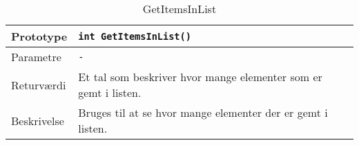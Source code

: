 \begin{table}[h]
\begin{tabularx}{\textwidth}{| >{\raggedright\arraybackslash}p{2.5 cm} | >{\raggedright\arraybackslash}X |} \hline
Prototype & \texttt{int GetItemsInList()} \\\hline
Parametre & \texttt{-} \\\hline
Returværdi & Et tal som beskriver hvor mange elementer som er gemt i listen. \\\hline
Beskrivelse & Bruges til at se hvor mange elementer der er gemt i listen. \\\hline
\end{tabularx}
\caption{GetItemsInList}
\label{table:GetItemsInList}
\end{table}